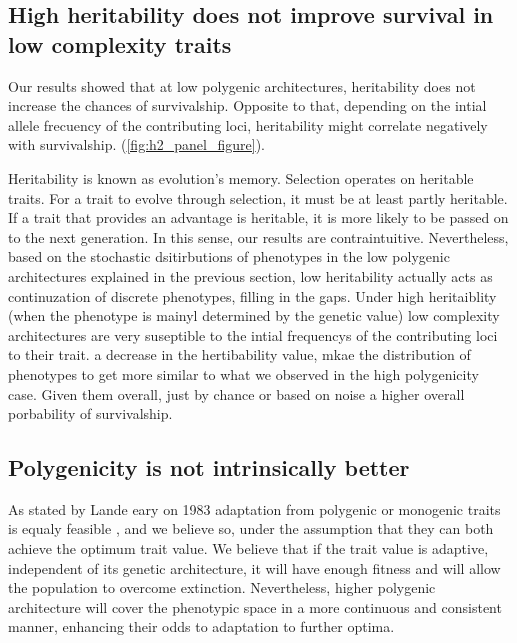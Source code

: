 \documentclass{article}
\begin{document}
\subsection{High heritability does not improve survival in low complexity traits}

Our results showed that at low polygenic architectures, heritability does not increase the chances of survivalship. Opposite to that, depending on the intial allele frecuency of the contributing loci, heritability might correlate negatively with survivalship. (\ref{fig:h2_panel_figure}).

Heritability is known as evolution's memory.  Selection operates on heritable traits. For a trait to evolve through selection, it must be at least partly heritable. If a trait that provides an advantage is heritable, it is more likely to be passed on to the next generation.  In this sense, our results are contraintuitive. Nevertheless, based on the stochastic dsitirbutions of phenotypes in the low polygenic architectures explained in the previous section, low heritability actually acts as continuzation of discrete phenotypes, filling in the gaps. Under high heritaiblity (when the phenotype is mainyl determined by the genetic value) low complexity architectures are very suseptible to the intial frequencys of the contributing loci to their trait. a decrease in the hertibability value, mkae the distribution of phenotypes to get more similar to what we observed in the high polygenicity case. Given them overall, just by chance or based on noise a higher overall porbability of survivalship. 

\subsection{Polygenicity is not intrinsically better}

As stated by Lande eary on 1983 adaptation from polygenic or monogenic traits is equaly feasible  \citep{Lande1983-kz}, and we believe so, under the assumption that they can both achieve the optimum trait value. We believe that if the trait value is adaptive, independent of its genetic architecture, it will have enough fitness and will allow the population to overcome extinction. Nevertheless, higher polygenic architecture will cover the phenotypic space in a more continuous and consistent manner, enhancing their odds to adaptation to further optima. 
\end{document}
